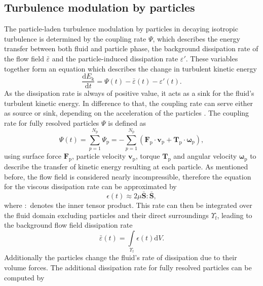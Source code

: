 \documentclass[11pt,a4paper,openany,oneside,parskip=half*]{article}
\renewcommand*\vec[1]{\boldsymbol{#1}}
\begin{document}
\subsection{Turbulence modulation by particles}
The particle-laden turbulence modulation by particles in decaying isotropic turbulence is determined by the coupling rate $\Psi$, which describes the energy transfer between both fluid and particle phase, the background dissipation rate of the flow field $\bar{\varepsilon}$ and the particle-induced dissipation rate $\varepsilon'$. These variables together form an equation which describes the change in turbulent kinetic energy
\begin{equation}
\frac{\mathrm{d} E_\mathrm{k}}{\mathrm{d} t} = \Psi (t) - \bar{\varepsilon} (t) - \varepsilon' (t).
\end{equation}
As the dissipation rate is always of positive value, it acts as a sink for the fluid's turbulent kinetic energy. In difference to that, the coupling rate can serve either as source or sink, depending on the acceleration of the particles \cite{mechanismsoftwowaycoupling}. The coupling rate for fully resolved particles $\Psi$ is defined as
\begin{equation}
\Psi (t) = \sum_{p=1}^{N_\mathrm{p}} \Psi_\mathrm{p}= - \sum_{p=1}^{N_\mathrm{p}} (\vec{F}_\mathrm{p} \cdot \vec{v}_\mathrm{p} + \vec{T}_\mathrm{p} \cdot \vec{\omega}_\mathrm{p}),
\end{equation}
using surface force $\vec{F}_\mathrm{p}$, particle velocity $\vec{v}_\mathrm{p}$, torque $\vec{T}_\mathrm{p}$ and angular velocity $\vec{\omega}_\mathrm{p}$ to describe the transfer of kinetic energy resulting at each particle. 
\newline
As mentioned before, the flow field is considered nearly incompressible, therefore the equation  for the viscous dissipation rate can be approximated by
\begin{equation}
 \epsilon (t) \approx 2 \mu \vec{\bar{S}}\vec{:}\vec{\bar{S}},
\end{equation}
where $\vec{:}$ denotes the inner tensor product. This rate can then be integrated over the fluid domain excluding particles and their direct surroundings $\Upsilon_\mathrm{f}$, leading to the background flow field dissipation rate
\begin{equation}
\bar{\varepsilon} (t) = \int\limits_{\Upsilon_\mathrm{f}} \epsilon(t) \mathrm{d}V.
\end{equation}
Additionally the particles change the fluid's rate of dissipation due to their volume forces. The additional dissipation rate for fully resolved particles can be computed by
\end{document}
